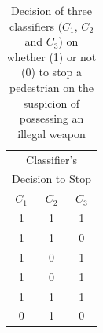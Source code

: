 \documentclass[runningheads]{llncs}
\begin{document}
\begin{table}[!htbp]
\begin{minipage}{.20\linewidth}
\begin{tabular}{|c|c|c|}
        \hline
\multicolumn{3}{|c|}{Classifier's} \\
\multicolumn{3}{|c|}{Decision to Stop} \\
\hline
$C_1$   &	$C_2$    &	$C_3$\\
\hline
1   &  1 & 1\\
\hline
1   &  1 & 0\\
\hline
1   &  0 & 1\\
\hline
1   &  0 & 1\\
\hline
1   &  1 & 1\\
\hline
0   &  1 & 0\\
\hline
\end{tabular}
\end{minipage}%
\\
\caption{Decision of three classifiers ($C_1$, $C_2$ and $C_3$) on whether (1) or not (0) to stop a pedestrian on the suspicion of possessing an illegal weapon}
\label{fig:disparates}
\end{table}
\end{document}
